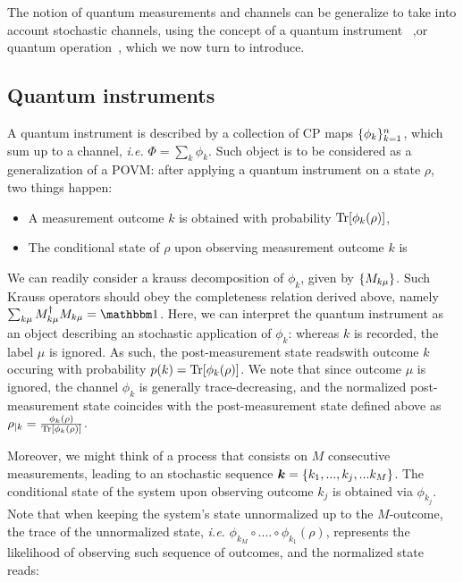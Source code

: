 The notion of quantum measurements and channels can be generalize to take into account stochastic channels, using the concept of a quantum instrument~\cite{watrous_2018} ,or quantum operation~\cite{Preskill1998}, which we now turn to introduce.
\subsection{Quantum instruments}\label{ssec:1_intro_operations}
A quantum instrument is described by a collection of CP maps $\lbrace \phi_k\rbrace_{k=1}^n$, which sum up to a channel, \textit{i.e.} $\Phi = \sum_k \phi_k$. Such object is to be considered as a generalization of a POVM: after applying a quantum instrument on a state $\rho$, two things happen:\begin{itemize}\item A measurement outcome $k$ is obtained with probability $\text{Tr}[\phi_k(\rho) ]$,\item The conditional state of $\rho$ upon observing measurement outcome $k$ is \end{itemize}
We can readily consider a krauss decomposition of $\phi_k$, given by $\lbrace M_{k \mu}\rbrace$. Such Krauss operators should obey the completeness relation derived above, namely $\sum_{k \mu} M^\dagger_{k \mu} M_{k \mu} = \id$. Here, we can interpret the quantum instrument as an object describing an stochastic application of $\phi_k$: whereas $k$ is recorded, the label $\mu$ is ignored. As such, the post-measurement state readswith outcome $k$ occuring with probability $p(k) = \text{Tr}[\phi_k(\rho)]$. We note that since outcome $\mu$ is ignored, the channel $\phi_k$ is generally trace-decreasing, and the normalized post-measurement state coincides with the post-measurement state defined above as $\rho_{|k} = \frac{\phi_k(\rho)}{\text{Tr}[\phi_k(\rho)]}$.

Moreover, we might think of a process that consists on $M$ consecutive measurements, leading to an stochastic sequence $\bm{k} = \lbrace k_1, ..., k_j,... k_M\rbrace$. The conditional state of the system upon observing outcome $k_j$ is obtained via $\phi_{k_j}$. Note that when keeping the system's state unnormalized up to the $M$-outcome, the trace of the unnormalized state, \textit{i.e.} $\phi_{k_M} \circ....\circ \phi_{k_1} (\rho)$, represents the likelihood of observing such sequence of outcomes, and the normalized state reads:

